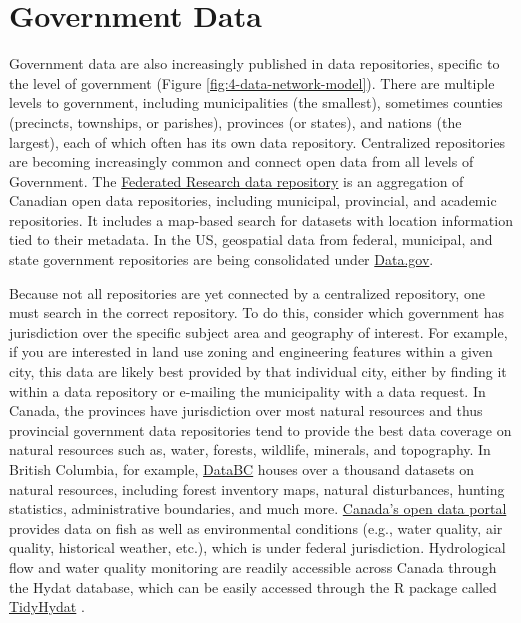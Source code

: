 \documentclass[
]{book}
\begin{document}
\section{Government Data}\label{government-data}

Government data are also increasingly published in data repositories, specific to the level of government (Figure \ref{fig:4-data-network-model}). There are multiple levels to government, including municipalities (the smallest), sometimes counties (precincts, townships, or parishes), provinces (or states), and nations (the largest), each of which often has its own data repository. Centralized repositories are becoming increasingly common and connect open data from all levels of Government. The \href{https://www.frdr-dfdr.ca/repo/}{Federated Research data repository} is an aggregation of Canadian open data repositories, including municipal, provincial, and academic repositories. It includes a map-based search for datasets with location information tied to their metadata. In the US, geospatial data from federal, municipal, and state government repositories are being consolidated under \href{https://www.data.gov/}{Data.gov}.

Because not all repositories are yet connected by a centralized repository, one must search in the correct repository. To do this, consider which government has jurisdiction over the specific subject area and geography of interest. For example, if you are interested in land use zoning and engineering features within a given city, this data are likely best provided by that individual city, either by finding it within a data repository or e-mailing the municipality with a data request. In Canada, the provinces have jurisdiction over most natural resources and thus provincial government data repositories tend to provide the best data coverage on natural resources such as, water, forests, wildlife, minerals, and topography. In British Columbia, for example, \href{https://www.data.gov.bc.ca/}{DataBC} houses over a thousand datasets on natural resources, including forest inventory maps, natural disturbances, hunting statistics, administrative boundaries, and much more. \href{https://open.canada.ca/en/open-data}{Canada's open data portal} provides data on fish as well as environmental conditions (e.g., water quality, air quality, historical weather, etc.), which is under federal jurisdiction. Hydrological flow and water quality monitoring are readily accessible across Canada through the Hydat database, which can be easily accessed through the R package called \href{https://cran.r-project.org/web/packages/tidyhydat/vignettes/tidyhydat_an_introduction.html}{TidyHydat} \citep{albers_tidyhydat_2017}.
\end{document}
